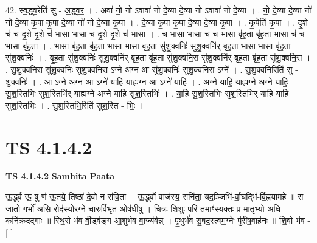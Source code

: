 \documentclass[17pt]{extarticle}
\begin{document}
42. स्व॒द्ध्व॒रेति॑ सु - अ॒द्ध्व॒र॒ । . अवा॑ नो॒ नो ऽवावा॑ नो दे॒व्या दे॒व्या नो ऽवावा॑ नो दे॒व्या । . नो॒ दे॒व्या दे॒व्या नो॑ नो दे॒व्या कृ॒पा कृ॒पा दे॒व्या नो॑ नो दे॒व्या कृ॒पा । . दे॒व्या कृ॒पा कृ॒पा दे॒व्या दे॒व्या कृ॒पा । . कृ॒पेति॑ कृ॒पा । . दृ॒शे च॑ च दृ॒शे दृ॒शे च॑ भा॒सा भा॒सा च॑ दृ॒शे दृ॒शे च॑ भा॒सा । . च॒ भा॒सा भा॒सा च॑ च भा॒सा बृ॑ह॒ता बृ॑ह॒ता भा॒सा च॑ च भा॒सा बृ॑ह॒ता । . भा॒सा बृ॑ह॒ता बृ॑ह॒ता भा॒सा भा॒सा बृ॑ह॒ता सु॑शु॒क्वनिः॑ सुशु॒क्वनि॑र् बृह॒ता भा॒सा भा॒सा बृ॑ह॒ता सु॑शु॒क्वनिः॑ । . बृ॒ह॒ता सु॑शु॒क्वनिः॑ सुशु॒क्वनि॑र् बृह॒ता बृ॑ह॒ता सु॑शु॒क्वनि॒रा सु॑शु॒क्वनि॑र् बृह॒ता बृ॑ह॒ता सु॑शु॒क्वनि॒रा । . सु॒शु॒क्वनि॒रा सु॑शु॒क्वनिः॑ सुशु॒क्वनि॒रा ऽग्ने॑ अग्न॒ आ सु॑शु॒क्वनिः॑ सुशु॒क्वनि॒रा ऽग्ने᳚ । . सु॒शु॒क्वनि॒रिति॑ सु - शु॒क्वनिः॑ । . आ ऽग्ने॑ अग्न॒ आ ऽग्ने॑ याहि याह्यग्न॒ आ ऽग्ने॑ याहि । . अ॒ग्ने॒ या॒हि॒ या॒ह्य॒ग्ने॒ अ॒ग्ने॒ या॒हि॒ सु॒श॒स्तिभिः॑ सुश॒स्तिभि॑र् याह्यग्ने अग्ने याहि सुश॒स्तिभिः॑ । . या॒हि॒ सु॒श॒स्तिभिः॑ सुश॒स्तिभि॑र् याहि याहि सुश॒स्तिभिः॑ । . सु॒श॒स्तिभि॒रिति॑ सुश॒स्ति - भिः॒ । \newline
\pagebreak
{}

\section{ TS 4.1.4.2 }

\textbf{TS 4.1.4.2 } \newline
\textbf{Samhita Paata} \newline

ऊ॒र्द्ध्व ऊ॒ षु ण॑ ऊ॒तये॒ तिष्ठा॑ दे॒वो न स॑वि॒ता । ऊ॒र्द्ध्वो वाज॑स्य॒ सनि॑ता॒ यद॒ञ्जिभि॑-र्वा॒घद्भि॑-र्वि॒ह्वया॑महे ॥ स जा॒तो गर्भो॑ असि॒ रोद॑स्यो॒रग्ने॒ चारु॒र्विभृ॑त॒ ओष॑धीषु । चि॒त्रः शिशुः॒ परि॒ तमाꣳ॑स्य॒क्तः प्र मा॒तृभ्यो॒ अधि॒ कनि॑क्रदद्गाः ॥ स्थि॒रो भ॑व वी॒ड्व॑ङ्ग आ॒शुर्भ॑व वा॒ज्य॑र्वन्न् । पृ॒थुर्भ॑व सु॒षद॒स्त्वम॒ग्नेः पु॑रीष॒वाह॑नः ॥ शि॒वो भ॑व - [  ] \newline
\end{document}
